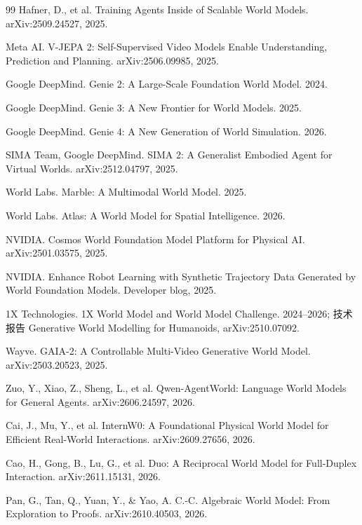 \documentclass[10pt,fontset=fandol]{ctexart}
\begin{document}
\begin{thebibliography}{99}
Hafner, D., et al. Training Agents Inside of Scalable World Models. arXiv:2509.24527, 2025.

Meta AI. V-JEPA 2: Self-Supervised Video Models Enable Understanding, Prediction and Planning. arXiv:2506.09985, 2025.

Google DeepMind. Genie 2: A Large-Scale Foundation World Model. 2024.

Google DeepMind. Genie 3: A New Frontier for World Models. 2025.

Google DeepMind. Genie 4: A New Generation of World Simulation. 2026.

SIMA Team, Google DeepMind. SIMA 2: A Generalist Embodied Agent for Virtual Worlds. arXiv:2512.04797, 2025.

World Labs. Marble: A Multimodal World Model. 2025.

World Labs. Atlas: A World Model for Spatial Intelligence. 2026.

NVIDIA. Cosmos World Foundation Model Platform for Physical AI. arXiv:2501.03575, 2025.

NVIDIA. Enhance Robot Learning with Synthetic Trajectory Data Generated by World Foundation Models. Developer blog, 2025.

1X Technologies. 1X World Model and World Model Challenge. 2024--2026; 技术报告 Generative World Modelling for Humanoids, arXiv:2510.07092.

Wayve. GAIA-2: A Controllable Multi-Video Generative World Model. arXiv:2503.20523, 2025.

Zuo, Y., Xiao, Z., Sheng, L., et al. Qwen-AgentWorld: Language World Models for General Agents. arXiv:2606.24597, 2026.

Cai, J., Mu, Y., et al. InternW0: A Foundational Physical World Model for Efficient Real-World Interactions. arXiv:2609.27656, 2026.

Cao, H., Gong, B., Lu, G., et al. Duo: A Reciprocal World Model for Full-Duplex Interaction. arXiv:2611.15131, 2026.

Pan, G., Tan, Q., Yuan, Y., \& Yao, A. C.-C. Algebraic World Model: From Exploration to Proofs. arXiv:2610.40503, 2026.


\end{thebibliography}
\end{document}
